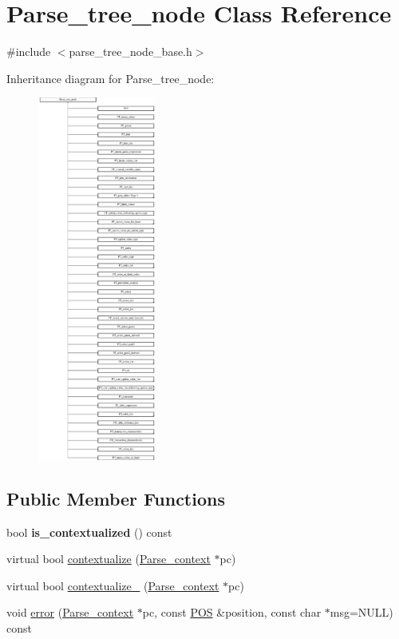 \hypertarget{classParse__tree__node}{}\section{Parse\+\_\+tree\+\_\+node Class Reference}
\label{classParse__tree__node}


{\ttfamily \#include $<$parse\+\_\+tree\+\_\+node\+\_\+base.\+h$>$}

Inheritance diagram for Parse\+\_\+tree\+\_\+node\+:\begin{figure}[H]
\begin{center}
\leavevmode
\includegraphics[height=12.000000cm]{classParse__tree__node}
\end{center}
\end{figure}
\subsection*{Public Member Functions}
\begin{DoxyCompactItemize}
\item 
\mbox{\label{classParse__tree__node_a528251e2f386174efd83497d06d8c963}} 
bool {\bfseries is\+\_\+contextualized} () const
\item 
virtual bool \mbox{\hyperlink{classParse__tree__node_a22d93524a537d0df652d7efa144f23da}{contextualize}} (\mbox{\hyperlink{structParse__context}{Parse\+\_\+context}} $\ast$pc)
\item 
virtual bool \mbox{\hyperlink{classParse__tree__node_ac8f1179a43a65742a342cad21a93aa0e}{contextualize\+\_\+}} (\mbox{\hyperlink{structParse__context}{Parse\+\_\+context}} $\ast$pc)
\item 
void \mbox{\hyperlink{classParse__tree__node_a3e43a52bddede2f3ffd34257a8863c85}{error}} (\mbox{\hyperlink{structParse__context}{Parse\+\_\+context}} $\ast$pc, const \mbox{\hyperlink{structYYLTYPE}{P\+OS}} \&position, const char $\ast$msg=N\+U\+LL) const
\end{DoxyCompactItemize}
